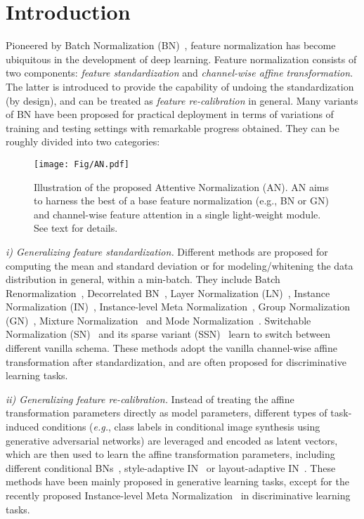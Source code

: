 \documentclass[runningheads]{llncs}
\newcommand{\eg}{\emph{e.g.}}
\begin{document}
\section{Introduction} 
Pioneered by Batch Normalization (BN)~\cite{BatchNorm}, feature normalization has become ubiquitous in the development of deep learning. Feature normalization consists of two components: \textit{feature standardization} and \textit{channel-wise affine transformation}. The latter is introduced to provide the capability of undoing the standardization (by design), and can be treated as \textit{feature re-calibration} in general. Many variants of BN have been proposed for practical deployment in terms of variations of training and testing settings with remarkable progress obtained. They can be roughly divided into two categories: 
\begin{figure*} [t]
    \centering
    \texttt{[image: Fig/AN.pdf]}
    \caption{Illustration of the proposed Attentive Normalization (AN). AN aims to harness the best of a base feature normalization (e.g., BN or GN) and channel-wise feature attention in a single light-weight module.     See text for details.}
    \label{fig:AN} \end{figure*}

\textit{i) Generalizing feature standardization.} Different methods are proposed for computing the mean and standard deviation or for modeling/whitening the data distribution in general, within a min-batch. They include Batch Renormalization~\cite{BatchReNorm}, Decorrelated BN~\cite{DecorBN},  Layer Normalization (LN)~\cite{LayerNorm}, Instance Normalization (IN)~\cite{InstNorm}, Instance-level Meta Normalization~\cite{InstMetaNorm},  Group Normalization (GN)~\cite{GroupNorm},  Mixture Normalization~\cite{MixtureNorm} and Mode Normalization~\cite{ModeNorm}. Switchable Normalization (SN)~\cite{SwitchNorm} and its sparse variant (SSN)~\cite{SSN} learn to switch between different vanilla schema. These methods adopt the vanilla channel-wise affine transformation after standardization, and are often proposed for discriminative learning tasks. 

\textit{ii) Generalizing feature re-calibration.} Instead of treating the affine transformation parameters directly as model parameters, different types of task-induced conditions (\eg, class labels in conditional image synthesis using generative adversarial networks) are leveraged and encoded as latent vectors, which are then used to learn the affine transformation parameters, including different conditional BNs~\cite{CBatchNorm1,CBatchNorm2,ConditionNorm,CGAN,BigGAN}, style-adaptive IN~\cite{StyleGAN} or layout-adaptive IN~\cite{SPatialAdaNorm,ISLANorm}. These methods have been mainly proposed in generative learning tasks, except for the recently proposed Instance-level Meta Normalization~\cite{InstMetaNorm} in discriminative learning tasks. 
\end{document}
